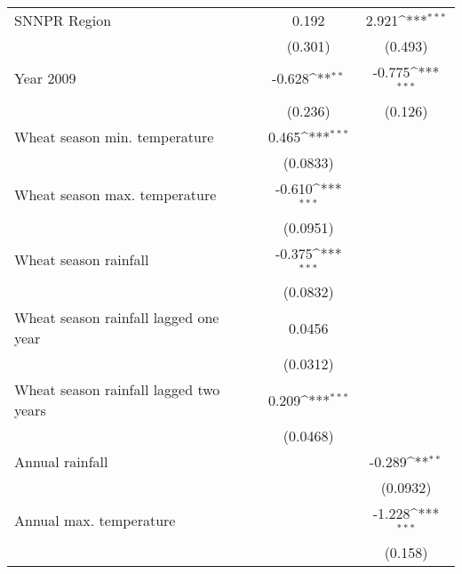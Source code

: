 \documentclass{beamer}
\def\sym#1{\ifmmode^{#1}\else\(^{#1}\)\fi}
\begin{document}
\begin{frame}[shrink=40]
\begin{table}
\begin{tabular}{l c c c}
SNNPR Region        &                     &       0.192         &       2.921\sym{***}\\
                    &                     &     (0.301)         &     (0.493)         \\

Year 2009         &                     &      -0.628\sym{**} &      -0.775\sym{***}\\
                    &                     &     (0.236)         &     (0.126)         \\

Wheat season min. temperature       &                     &       0.465\sym{***}&                     \\
                    &                     &    (0.0833)         &                     \\

Wheat season max. temperature      &                     &      -0.610\sym{***}&                     \\
                    &                     &    (0.0951)         &                     \\

Wheat season rainfall      &                     &      -0.375\sym{***}&                     \\
                    &                     &    (0.0832)         &                     \\

Wheat season rainfall  lagged one year    &                     &      0.0456         &                     \\
                    &                     &    (0.0312)         &                     \\

Wheat season rainfall  lagged two years      &                     &       0.209\sym{***}&                     \\
                    &                     &    (0.0468)         &                     \\

Annual rainfall     &                     &                     &      -0.289\sym{**} \\
                    &                     &                     &    (0.0932)         \\

Annual max. temperature   &                     &                     &      -1.228\sym{***}\\
                    &                     &                     &     (0.158)         \\


\end{tabular}
\end{table}
\end{frame}
\end{document}
